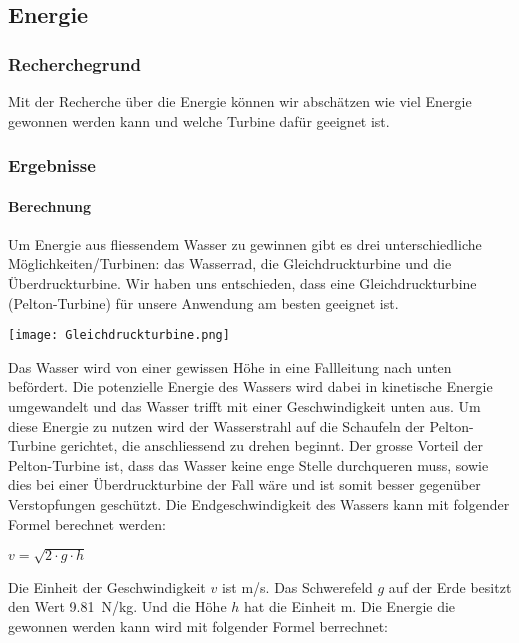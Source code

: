 \subsection{Energie}

\subsubsection{Recherchegrund}

Mit der Recherche über die Energie können wir abschätzen wie viel Energie gewonnen werden kann und welche Turbine dafür geeignet ist.

\subsubsection{Ergebnisse}

\paragraph{Berechnung}

Um Energie aus fliessendem Wasser zu gewinnen gibt es drei unterschiedliche Möglichkeiten/Turbinen: das Wasserrad, die Gleichdruckturbine und die Überdruckturbine. Wir haben uns entschieden, dass eine Gleichdruckturbine (Pelton-Turbine) für unsere Anwendung am besten geeignet ist.

\begin{center}
\texttt{[image: Gleichdruckturbine.png]}
\end{center}

Das Wasser wird von einer gewissen Höhe in eine Fallleitung nach unten befördert. Die potenzielle Energie des Wassers wird dabei in kinetische Energie umgewandelt und das Wasser trifft mit einer Geschwindigkeit unten aus. Um diese Energie zu nutzen wird der Wasserstrahl auf die Schaufeln der Pelton-Turbine gerichtet, die anschliessend zu drehen beginnt. Der grosse Vorteil der Pelton-Turbine ist, dass das Wasser keine enge Stelle durchqueren muss, sowie dies bei einer Überdruckturbine der Fall wäre und ist somit besser gegenüber Verstopfungen geschützt.
\newline
\newline 
\newline
Die Endgeschwindigkeit des Wassers kann mit folgender Formel berechnet werden:
\begin{center}
\(v = \sqrt{2 \cdot g \cdot h} \)
\end{center}

Die Einheit der Geschwindigkeit \(v\) ist \si{m/s}. Das Schwerefeld \(g\) auf der Erde besitzt den Wert 9.81~\si{N/kg}. Und die Höhe \(h\) hat die Einheit \si{m}.
\newline 
\newline 
\newline
Die Energie die gewonnen werden kann wird mit folgender Formel berrechnet:

